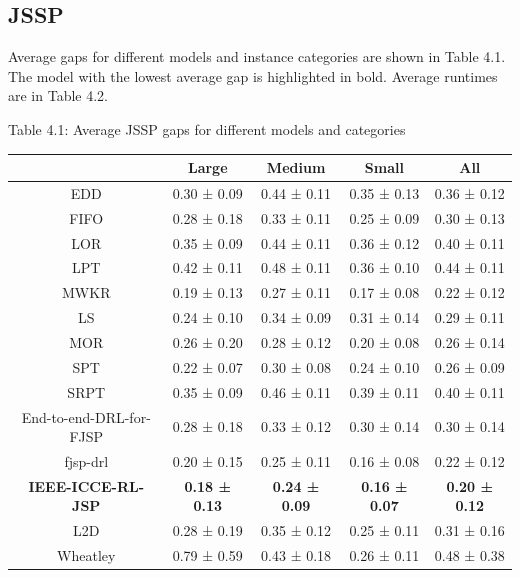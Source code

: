 \subsection{JSSP} \label{results_jssp}
Average gaps for different models and instance categories are shown in Table 4.1. The model with the lowest average gap is highlighted in bold. Average runtimes are in Table 4.2. 

\begin{table}
    Table 4.1: Average JSSP gaps for different models and categories\\
    \vspace{1mm}
    \small 
    \begin{tabular}{ccccc}
        \toprule
         & Large & Medium & Small & All \\ 
        \midrule
        EDD & 0.30 ± 0.09 & 0.44 ± 0.11 & 0.35 ± 0.13 & 0.36 ± 0.12 \\
        FIFO & 0.28 ± 0.18 & 0.33 ± 0.11 & 0.25 ± 0.09 & 0.30 ± 0.13  \\
        LOR & 0.35 ± 0.09 & 0.44 ± 0.11 & 0.36 ± 0.12 & 0.40 ± 0.11\\
        LPT & 0.42 ± 0.11 & 0.48 ± 0.11 & 0.36 ± 0.10 & 0.44 ± 0.11\\
        MWKR & 0.19 ± 0.13 & 0.27 ± 0.11 & 0.17 ± 0.08 & 0.22 ± 0.12 \\
        LS & 0.24 ± 0.10 & 0.34 ± 0.09 & 0.31 ± 0.14 & 0.29 ± 0.11 \\
        MOR & 0.26 ± 0.20 & 0.28 ± 0.12 & 0.20 ± 0.08 & 0.26 ± 0.14 \\
        SPT & 0.22 ± 0.07 & 0.30 ± 0.08 & 0.24 ± 0.10 & 0.26 ± 0.09 \\
        SRPT & 0.35 ± 0.09 & 0.46 ± 0.11 & 0.39 ± 0.11 & 0.40 ± 0.11 \\
        End-to-end-DRL-for-FJSP & 0.28 ± 0.18 & 0.33 ± 0.12 & 0.30 ± 0.14 & 0.30 ± 0.14  \\
        fjsp-drl & 0.20 ± 0.15 & 0.25 ± 0.11 & 0.16 ± 0.08 & 0.22 ± 0.12 \\
        \textbf{IEEE-ICCE-RL-JSP} & \textbf{0.18 ± 0.13} & \textbf{0.24 ± 0.09} & \textbf{0.16 ± 0.07} & \textbf{0.20 ± 0.12} \\
        L2D & 0.28 ± 0.19 & 0.35 ± 0.12 & 0.25 ± 0.11 & 0.31 ± 0.16 \\
        Wheatley & 0.79 ± 0.59 & 0.43 ± 0.18 & 0.26 ± 0.11 & 0.48 ± 0.38 \\
        \bottomrule
    \end{tabular}
\end{table}


